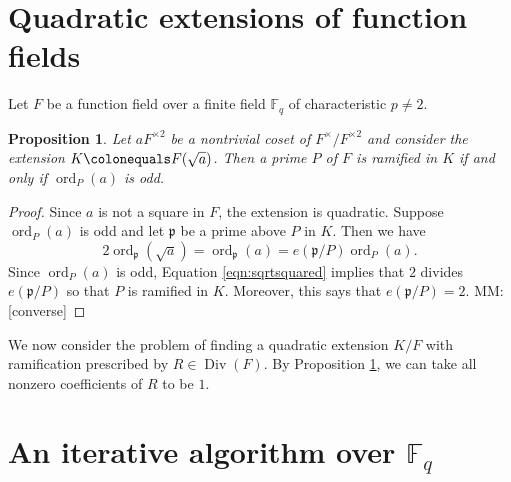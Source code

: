 \documentclass{dcthesis}
\newcommand{\mm}[1]{{\color{blue} \sf MM: [#1]}}
\newcommand{\FF}{\mathbb{F}}
\DeclareMathOperator{\Div}{Div}
\DeclareMathOperator{\ord}{ord}
\DeclareMathOperator{\Pl}{Pl}
\numberwithin{equation}{section}
\newtheorem{prop}[equation]{Proposition}
\theoremstyle{definition}
\theoremstyle{remark}
\begin{document}
{  \section{Quadratic extensions of function fields}{\label{sec:functionfieldextensions}
    Let $F$ be a function field
    over a finite field $\FF_q$
    of characteristic $p\neq 2$.
    \begin{prop}
      \label{prop:kummerramification}
      Let $aF^{\times 2}$ be a nontrivial
      coset of $F^\times/F^{\times 2}$
      and consider the extension
      $K\colonequals F(\sqrt{a})$.
      Then a prime $P$ of $F$ is ramified
      in $K$ if and only if
      $\ord_P(a)$ is odd.
    \end{prop}
    \begin{proof}
      Since $a$ is not a square in $F$,
      the extension is quadratic.
      Suppose $\ord_P(a)$ is odd
      and let $\mathfrak{p}$ be
      a prime above $P$ in $K$.
      Then we have
      \begin{equation}
        \label{eqn:sqrtsquared}
        2\ord_{\mathfrak{p}}(\sqrt{a})
        = \ord_{\mathfrak{p}}(a)
        = e(\mathfrak{p}/P)\ord_P(a).
      \end{equation}
      Since $\ord_P(a)$ is odd,
      Equation \ref{eqn:sqrtsquared}
      implies that $2$ divides
      $e(\mathfrak{p}/P)$ so that
      $P$ is ramified in $K$.
      Moreover, this says that
      $e(\mathfrak{p}/P) = 2$.
      \mm{converse}
    \end{proof}
    We now consider the problem of
    finding a quadratic extension $K/F$
    with ramification prescribed by
    $R\in\Div(F)$.
    By Proposition
    \ref{prop:kummerramification},
    we can take all nonzero coefficients
    of $R$ to be $1$.
  }
  \section{An iterative algorithm over $\FF_q$}{\label{sec:functionfieldalgorithm}
  }
}
\end{document}
